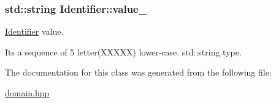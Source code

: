 \subsubsection[{\texorpdfstring{value\+\_\+}{value_}}]{\setlength{\rightskip}{0pt plus 5cm}std\+::string Identifier\+::value\+\_\+\hspace{0.3cm}{\ttfamily [private]}}\hypertarget{classIdentifier_acc41cf6f89bc5a8572fa474d2739fa28}{}\label{classIdentifier_acc41cf6f89bc5a8572fa474d2739fa28}


\hyperlink{classIdentifier}{Identifier} value. 

It\textquotesingle{}s a sequence of 5 letter(\+X\+X\+X\+X\+X) lower-\/case. std\+::string type. 

The documentation for this class was generated from the following file\+:\begin{DoxyCompactItemize}
\item 
\hyperlink{domain_8hpp}{domain.\+hpp}\end{DoxyCompactItemize}
